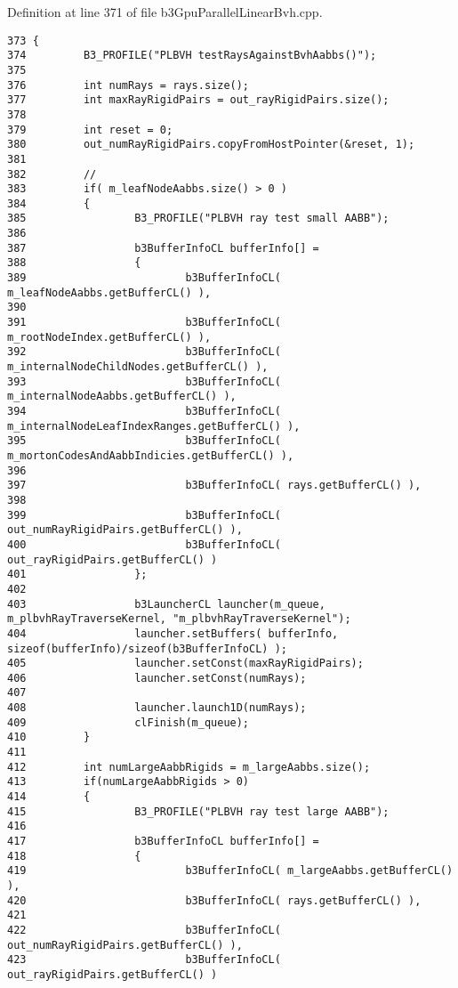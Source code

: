 Definition at line 371 of file b3GpuParallelLinearBvh.cpp.

\begin{Code}\begin{verbatim}373 {
374         B3_PROFILE("PLBVH testRaysAgainstBvhAabbs()");
375         
376         int numRays = rays.size();
377         int maxRayRigidPairs = out_rayRigidPairs.size();
378         
379         int reset = 0;
380         out_numRayRigidPairs.copyFromHostPointer(&reset, 1);
381         
382         //
383         if( m_leafNodeAabbs.size() > 0 )
384         {
385                 B3_PROFILE("PLBVH ray test small AABB");
386         
387                 b3BufferInfoCL bufferInfo[] = 
388                 {
389                         b3BufferInfoCL( m_leafNodeAabbs.getBufferCL() ),
390                         
391                         b3BufferInfoCL( m_rootNodeIndex.getBufferCL() ),
392                         b3BufferInfoCL( m_internalNodeChildNodes.getBufferCL() ),
393                         b3BufferInfoCL( m_internalNodeAabbs.getBufferCL() ),
394                         b3BufferInfoCL( m_internalNodeLeafIndexRanges.getBufferCL() ),
395                         b3BufferInfoCL( m_mortonCodesAndAabbIndicies.getBufferCL() ),
396                         
397                         b3BufferInfoCL( rays.getBufferCL() ),
398                         
399                         b3BufferInfoCL( out_numRayRigidPairs.getBufferCL() ),
400                         b3BufferInfoCL( out_rayRigidPairs.getBufferCL() )
401                 };
402                 
403                 b3LauncherCL launcher(m_queue, m_plbvhRayTraverseKernel, "m_plbvhRayTraverseKernel");
404                 launcher.setBuffers( bufferInfo, sizeof(bufferInfo)/sizeof(b3BufferInfoCL) );
405                 launcher.setConst(maxRayRigidPairs);
406                 launcher.setConst(numRays);
407                 
408                 launcher.launch1D(numRays);
409                 clFinish(m_queue);
410         }
411         
412         int numLargeAabbRigids = m_largeAabbs.size();
413         if(numLargeAabbRigids > 0)
414         {
415                 B3_PROFILE("PLBVH ray test large AABB");
416                 
417                 b3BufferInfoCL bufferInfo[] = 
418                 {
419                         b3BufferInfoCL( m_largeAabbs.getBufferCL() ),
420                         b3BufferInfoCL( rays.getBufferCL() ),
421                         
422                         b3BufferInfoCL( out_numRayRigidPairs.getBufferCL() ),
423                         b3BufferInfoCL( out_rayRigidPairs.getBufferCL() )

\end{verbatim}
\end{Code}
